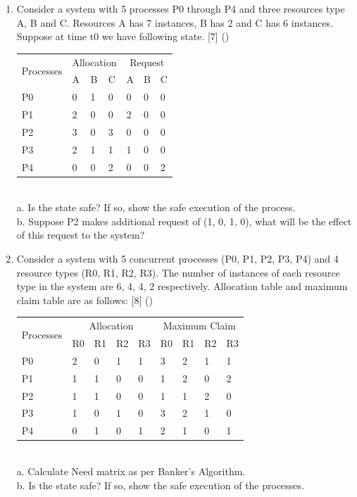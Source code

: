 \documentclass[12pt]{article}
\begin{document}
\begin{enumerate}
			\item Consider a system with 5 processes P0 through P4 and three resources type A, B and C. Resources A has 7 instances, B has 2 and C has 6 instances. Suppose at time t0 we have following state. \hfill [7] ()
			\begin{tabular}{|p{17mm}|p{7mm}|p{7mm}|p{7mm}|p{7mm}|p{7mm}|p{7mm}|}
				\hline
				\multirow{2}{*}{Processes} & \multicolumn{3}{|c|}{Allocation} & \multicolumn{3}{|c|}{Request} \\ \cline{2-7}
				& A & B & C & A & B & C \\ \hline
				P0 & 0 & 1 & 0 & 0 & 0 & 0 \\ \hline
				P1 & 2 & 0 & 0 & 2 & 0 & 0 \\ \hline
				P2 & 3 & 0 & 3 & 0 & 0 & 0 \\ \hline
				P3 & 2 & 1 & 1 & 1 & 0 & 0 \\ \hline
				P4 & 0 & 0 & 2 & 0 & 0 & 2 \\ \hline
			\end{tabular}\\
			a. Is the state safe? If so, show the safe execution of the process.\\
			b. Suppose P2 makes additional request of (1, 0, 1, 0), what will be the effect of this request to the system?

			\item Consider a system with 5 concurrent processes (P0, P1, P2, P3, P4) and 4 resource types (R0, R1, R2, R3). The number of instances of each resource type in the system are 6, 4, 4, 2 respectively. Allocation table and maximum claim table are as follows: \hfill [8] (\bo{\texttt{80 Bh}})
			\begin{tabular}{|p{17mm}|p{7mm}|p{7mm}|p{7mm}|p{7mm}||p{7mm}|p{7mm}|p{7mm}|p{7mm}|}
				\hline
				\multirow{2}{*}{Processes} & \multicolumn{4}{|c||}{Allocation} & \multicolumn{4}{|c|}{Maximum Claim} \\ \cline{2-7}
				& R0 & R1 & R2 & R3 & R0 & R1 & R2 & R3 \\ \hline
				P0 & 2 & 0 & 1 & 1 & 3 & 2 & 1 & 1 \\ \hline
				P1 & 1 & 1 & 0 & 0 & 1 & 2 & 0 & 2 \\ \hline
				P2 & 1 & 1 & 0 & 0 & 1 & 1 & 2 & 0 \\ \hline
				P3 & 1 & 0 & 1 & 0 & 3 & 2 & 1 & 0 \\ \hline
				P4 & 0 & 1 & 0 & 1 & 2 & 1 & 0 & 1 \\ \hline
			\end{tabular}\\
			a. Calculate Need matrix as per Banker's Algorithm.\\
			b. Is the state safe? If so, show the safe execution of the processes.


\end{enumerate}
\end{document}
